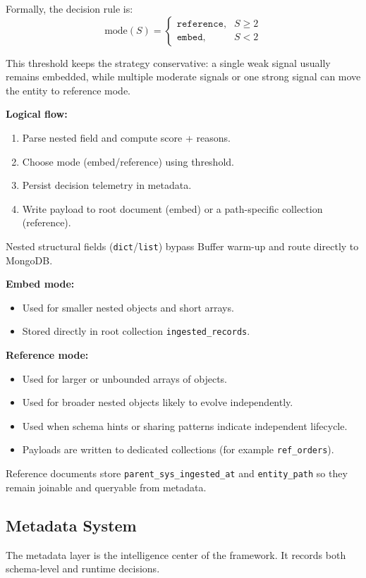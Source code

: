 \documentclass[12pt,a4paper]{article}
\begin{document}
Formally, the decision rule is:
\[
\text{mode}(S)=
\begin{cases}
\texttt{reference}, & S \ge 2 \\
\texttt{embed}, & S < 2
\end{cases}
\]

This threshold keeps the strategy conservative: a single weak signal usually remains embedded, while multiple moderate signals or one strong signal can move the entity to reference mode.

\textbf{Logical flow:}
\begin{enumerate}[leftmargin=*]
  \item Parse nested field and compute score + reasons.
  \item Choose mode (embed/reference) using threshold.
  \item Persist decision telemetry in metadata.
  \item Write payload to root document (embed) or a path-specific collection (reference).
\end{enumerate}

Nested structural fields (\texttt{dict}/\texttt{list}) bypass Buffer warm-up and route directly to MongoDB.

\textbf{Embed mode:}
\begin{itemize}[leftmargin=*]
  \item Used for smaller nested objects and short arrays.
  \item Stored directly in root collection \texttt{ingested\_records}.
\end{itemize}

\textbf{Reference mode:}
\begin{itemize}[leftmargin=*]
  \item Used for larger or unbounded arrays of objects.
  \item Used for broader nested objects likely to evolve independently.
  \item Used when schema hints or sharing patterns indicate independent lifecycle.
  \item Payloads are written to dedicated collections (for example \texttt{ref\_orders}).
\end{itemize}

Reference documents store \texttt{parent\_sys\_ingested\_at} and \texttt{entity\_path} so they remain joinable and queryable from metadata.

\subsection{Metadata System}
The metadata layer is the intelligence center of the framework. It records both schema-level and runtime decisions.
\end{document}

